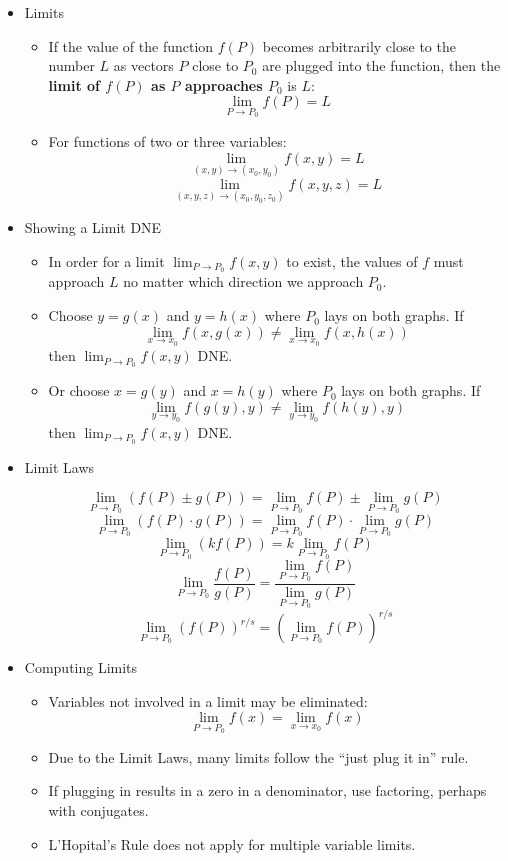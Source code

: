 \documentclass[12pt]{article}
\newcommand{\ds}{\displaystyle}
\newcommand{\<}{\left<}
\renewcommand{\>}{\right>}
\begin{document}
\begin{itemize}

  \item Limits
    \begin{itemize}
      \item If the value of the function $f(P)$ becomes arbitrarily close to the number $L$ as vectors $P$ close to $P_0$ are plugged into the function, then the \textbf{limit of $f(P)$ as $P$ approaches $P_0$} is $L$: \[\lim_{P\to P_0} f(P) = L\]
      \item For functions of two or three variables:
      \[\lim_{(x,y)\to(x_0,y_0)}f(x,y) = L\]
      \[\lim_{(x,y,z)\to(x_0,y_0,z_0)}f(x,y,z) = L\]
    \end{itemize}
  
  \item Showing a Limit DNE
  
    \begin{itemize}
      \item In order for a limit $\lim_{P\to P_0}f(x,y)$ to exist, the values of $f$ must approach $L$ no matter which direction we approach $P_0$.
      \item Choose $y=g(x)$ and $y=h(x)$ where $P_0$ lays on both graphs. If
        \[
          \lim_{x\to x_0} f(x,g(x)) \not= \lim_{x\to x_0} f(x,h(x))
        \]
        then $\ds\lim_{P\to P_0} f(x,y)$ DNE.
      \item Or choose $x=g(y)$ and $x=h(y)$ where $P_0$ lays on both graphs. If 
        \[
          \lim_{y\to y_0} f(g(y),y) \not= \lim_{y\to y_0} f(h(y),y)
        \]
        then $\ds\lim_{P\to P_0} f(x,y)$ DNE.
    \end{itemize}
    
  \item Limit Laws
  
    \[\lim_{P\to P_0}(f(P)\pm g(P)) = \lim_{P\to P_0}f(P) \pm \lim_{P\to P_0}g(P)\]
    \[\lim_{P\to P_0}(f(P)\cdot g(P)) = \lim_{P\to P_0}f(P) \cdot \lim_{P\to P_0}g(P)\]
    \[\lim_{P\to P_0}(kf(P)) = k\lim_{P\to P_0}f(P)\]
    \[\lim_{P\to P_0}\frac{f(P)}{g(P)} = \frac{\ds \lim_{P\to P_0}f(P)}{\ds \lim_{P\to P_0}g(P)}\]
    \[\lim_{P\to P_0}(f(P))^{r/s} = \left(\lim_{P\to P_0}f(P)\right)^{r/s}\]
          
  \item Computing Limits
    
      \begin{itemize}
      \item Variables not involved in a limit may be eliminated: \[\lim_{P \to P_0} f(x) = \lim_{x\to x_0} f(x)\]
      \item Due to the Limit Laws, many limits follow the ``just plug it in'' rule.
      \item If plugging in results in a zero in a denominator, use factoring, perhaps with conjugates.
      \item L'Hopital's Rule does not apply for multiple variable limits.
      \end{itemize}
  

\end{itemize}
\end{document}
